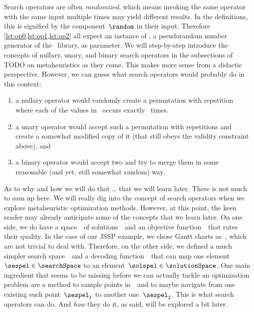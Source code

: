 Search operators are often \emph{randomized}, which means invoking the same operator with the same input multiple times may yield different results.
In the definitions, this is signified by the component~$\random$ in their input.
Therefore \cref{lst:op0,lst:op1,lst:op2} all expect an instance of \numpyGenerator, a pseudorandom number generator of the \numpy\ library, as parameter.
\endhsection%
%
%
%
We will step-by-step introduce the concepts of nullary, unary, and binary search operators in the subsections of TODO on metaheuristics as they come.
This makes more sense from a didactic perspective.
However, we can guess what search operators would probably do in this context:%
%
\begin{enumerate}%
\item a nullary operator would randomly create a permutation with repetition where each of the values in~ occurs exactly \jsspMachines~times.%
\item a unary operator would accept such a permutation with repetitions and create a somewhat modified copy of it (that still obeys the validity constraint above), and%
\item a binary operator would accept two and try to merge them in some reasonable (and yet, still somewhat random) way.%
\end{enumerate}%
%
As to why and how we will do that {\dots} that we will learn later.%
\endhsection%
%
%
There is not much to sum up here.
We will really dig into the concept of search operators when we explore metaheuristic optimization methods.
However, at this point, the keen reader may already anticipate some of the concepts that we learn later.
On one side, we do have a space~\solutionSpace\ of solutions~\solspel\ and an objective function~\objf\ that rates their quality.
In the case of our \gls{JSSP} example, we chose Gantt charts as~\solutionSpace, which are not trivial to deal with.
Therefore, on the other side, we defined a much simpler search space~\searchSpace\ and a decoding function~\decode\ that can map one element~$\sespel\in\searchSpace$ to an element~$\solspel\in\solutionSpace$.
One main ingredient that seems to be missing before we can actually tackle an optimization problem are a method to sample points in~\searchSpace\ and to maybe navigate from one existing such point~$\sespel_1$ to another one~$\sespel_2$.
This is what search operators can do.
And \emph{how} they do it, as said, will be explored a bit later.%
\endhsection%
\endhsection%
%
